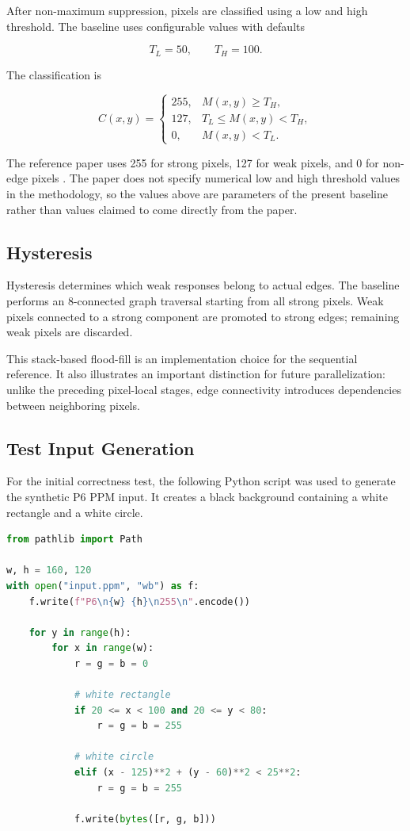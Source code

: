 \documentclass[conference]{IEEEtran}
\begin{document}
After non-maximum suppression, pixels are classified using a low and high
threshold. The baseline uses configurable values with defaults

\begin{equation}
T_L=50,\qquad T_H=100.
\end{equation}

The classification is

\begin{equation}
C(x,y)=
\begin{cases}
255, & M(x,y)\ge T_H,\\
127, & T_L\le M(x,y)<T_H,\\
0, & M(x,y)<T_L.
\end{cases}
\end{equation}

The reference paper uses 255 for strong pixels, 127 for weak pixels, and
0 for non-edge pixels \cite{horvath2023}. The paper does not specify
numerical low and high threshold values in the methodology, so the values
above are parameters of the present baseline rather than values claimed to
come directly from the paper.

\subsection{Hysteresis}

Hysteresis determines which weak responses belong to actual edges. The
baseline performs an 8-connected graph traversal starting from all strong
pixels. Weak pixels connected to a strong component are promoted to strong
edges; remaining weak pixels are discarded.

This stack-based flood-fill is an implementation choice for the sequential
reference. It also illustrates an important distinction for future
parallelization: unlike the preceding pixel-local stages, edge connectivity
introduces dependencies between neighboring pixels.


\subsection{Test Input Generation}

For the initial correctness test, the following Python script was used to
generate the synthetic P6 PPM input. It creates a black background containing
a white rectangle and a white circle.

\begin{lstlisting}[language=Python]
from pathlib import Path

w, h = 160, 120
with open("input.ppm", "wb") as f:
    f.write(f"P6\n{w} {h}\n255\n".encode())

    for y in range(h):
        for x in range(w):
            r = g = b = 0

            # white rectangle
            if 20 <= x < 100 and 20 <= y < 80:
                r = g = b = 255

            # white circle
            elif (x - 125)**2 + (y - 60)**2 < 25**2:
                r = g = b = 255

            f.write(bytes([r, g, b]))
\end{lstlisting}
\end{document}

